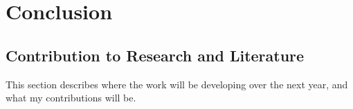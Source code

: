 
\chapter{Conclusion}\label{ch:conclusion}

\section{Contribution to Research and Literature} 

This section describes where the work will be developing over the next year, and what my contributions will be. 

%
%
%
